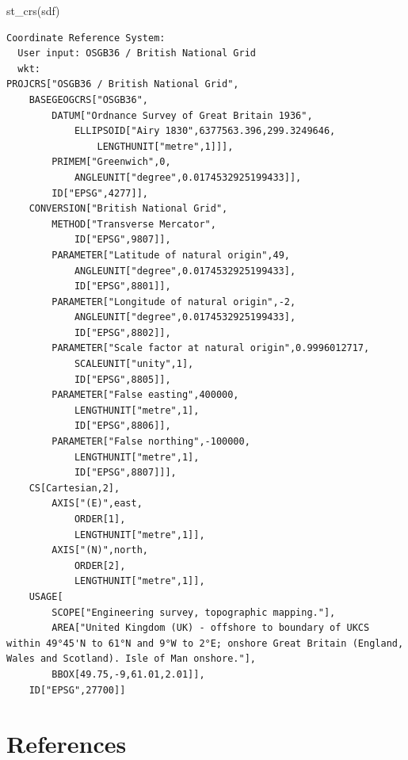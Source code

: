 \documentclass[
  letterpaper,
  DIV=11,
  numbers=noendperiod,
  oneside]{scrreprt}
\newenvironment{Shaded}{\begin{snugshade}}{\end{snugshade}}
\newcommand{\FunctionTok}[1]{\textcolor[rgb]{0.28,0.35,0.67}{#1}}
\newcommand{\NormalTok}[1]{\textcolor[rgb]{0.00,0.23,0.31}{#1}}
\begin{document}
\begin{Shaded}
\begin{Highlighting}[]
\FunctionTok{st\_crs}\NormalTok{(sdf)}
\end{Highlighting}
\end{Shaded}

\begin{verbatim}
Coordinate Reference System:
  User input: OSGB36 / British National Grid 
  wkt:
PROJCRS["OSGB36 / British National Grid",
    BASEGEOGCRS["OSGB36",
        DATUM["Ordnance Survey of Great Britain 1936",
            ELLIPSOID["Airy 1830",6377563.396,299.3249646,
                LENGTHUNIT["metre",1]]],
        PRIMEM["Greenwich",0,
            ANGLEUNIT["degree",0.0174532925199433]],
        ID["EPSG",4277]],
    CONVERSION["British National Grid",
        METHOD["Transverse Mercator",
            ID["EPSG",9807]],
        PARAMETER["Latitude of natural origin",49,
            ANGLEUNIT["degree",0.0174532925199433],
            ID["EPSG",8801]],
        PARAMETER["Longitude of natural origin",-2,
            ANGLEUNIT["degree",0.0174532925199433],
            ID["EPSG",8802]],
        PARAMETER["Scale factor at natural origin",0.9996012717,
            SCALEUNIT["unity",1],
            ID["EPSG",8805]],
        PARAMETER["False easting",400000,
            LENGTHUNIT["metre",1],
            ID["EPSG",8806]],
        PARAMETER["False northing",-100000,
            LENGTHUNIT["metre",1],
            ID["EPSG",8807]]],
    CS[Cartesian,2],
        AXIS["(E)",east,
            ORDER[1],
            LENGTHUNIT["metre",1]],
        AXIS["(N)",north,
            ORDER[2],
            LENGTHUNIT["metre",1]],
    USAGE[
        SCOPE["Engineering survey, topographic mapping."],
        AREA["United Kingdom (UK) - offshore to boundary of UKCS within 49°45'N to 61°N and 9°W to 2°E; onshore Great Britain (England, Wales and Scotland). Isle of Man onshore."],
        BBOX[49.75,-9,61.01,2.01]],
    ID["EPSG",27700]]
\end{verbatim}


\chapter*{References}\label{references}

\end{document}
